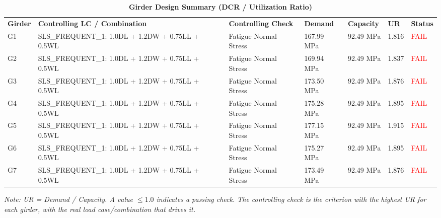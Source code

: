 \documentclass[12pt,a4paper]{report}
\numberwithin{table}{chapter}
\numberwithin{figure}{chapter}
\begin{document}
\vspace{1em}
\vspace{0.4em}
\begin{longtable}{|C{1.6cm}|>{\centering\arraybackslash}p{3.6cm}|C{2.4cm}|C{2.0cm}|C{2.1cm}|C{1.7cm}|C{1.5cm}|}
\caption{\textbf{Girder Design Summary (DCR / Utilization Ratio)}} \\
\hline
\endfirsthead
\hline
\caption{\textbf{Girder Design Summary (DCR / Utilization Ratio)}} \\
\hline
\endhead
\textbf{Girder} & \textbf{Controlling LC / Combination} & \textbf{Controlling Check} & \textbf{Demand} & \textbf{Capacity} & \textbf{UR} & \textbf{Status} \\[6pt]
\hline
G1 & SLS\_\allowbreak{}FREQUENT\_\allowbreak{}1:\allowbreak{} 1.0DL + 1.2DW + 0.75LL + 0.5WL & Fatigue Normal Stress & 167.99 MPa & 92.49 MPa & 1.816 & \textcolor{red}{FAIL} \\[6pt]
\hline
G2 & SLS\_\allowbreak{}FREQUENT\_\allowbreak{}1:\allowbreak{} 1.0DL + 1.2DW + 0.75LL + 0.5WL & Fatigue Normal Stress & 169.94 MPa & 92.49 MPa & 1.837 & \textcolor{red}{FAIL} \\[6pt]
\hline
G3 & SLS\_\allowbreak{}FREQUENT\_\allowbreak{}1:\allowbreak{} 1.0DL + 1.2DW + 0.75LL + 0.5WL & Fatigue Normal Stress & 173.50 MPa & 92.49 MPa & 1.876 & \textcolor{red}{FAIL} \\[6pt]
\hline
G4 & SLS\_\allowbreak{}FREQUENT\_\allowbreak{}1:\allowbreak{} 1.0DL + 1.2DW + 0.75LL + 0.5WL & Fatigue Normal Stress & 175.28 MPa & 92.49 MPa & 1.895 & \textcolor{red}{FAIL} \\[6pt]
\hline
G5 & SLS\_\allowbreak{}FREQUENT\_\allowbreak{}1:\allowbreak{} 1.0DL + 1.2DW + 0.75LL + 0.5WL & Fatigue Normal Stress & 177.15 MPa & 92.49 MPa & 1.915 & \textcolor{red}{FAIL} \\[6pt]
\hline
G6 & SLS\_\allowbreak{}FREQUENT\_\allowbreak{}1:\allowbreak{} 1.0DL + 1.2DW + 0.75LL + 0.5WL & Fatigue Normal Stress & 175.27 MPa & 92.49 MPa & 1.895 & \textcolor{red}{FAIL} \\[6pt]
\hline
G7 & SLS\_\allowbreak{}FREQUENT\_\allowbreak{}1:\allowbreak{} 1.0DL + 1.2DW + 0.75LL + 0.5WL & Fatigue Normal Stress & 173.49 MPa & 92.49 MPa & 1.876 & \textcolor{red}{FAIL} \\[6pt]
\hline
\end{longtable}
\noindent\textit{Note: UR = Demand / Capacity. A value $\leq 1.0$ indicates a passing check. The controlling check is the criterion with the highest UR for each girder, with the real load case/combination that drives it.}
\end{document}
